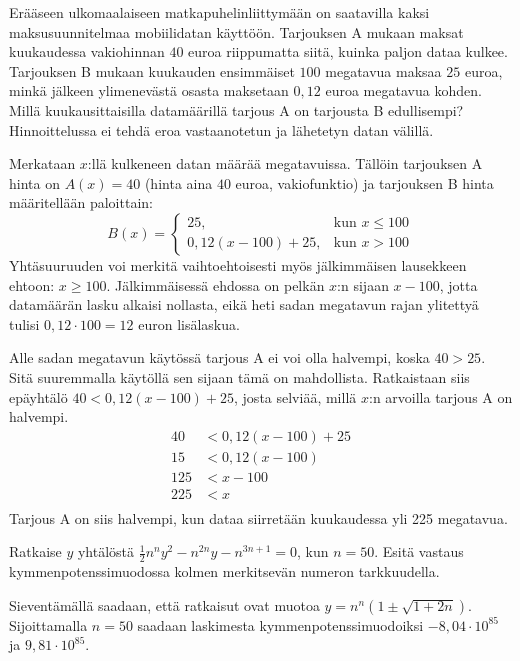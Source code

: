 \begin{multicols}{2}
\begin{tehtava} %
Erääseen ulkomaalaiseen matkapuhelinliittymään on saatavilla kaksi maksusuunnitelmaa mobiilidatan käyttöön. Tarjouksen A mukaan maksat kuukaudessa vakiohinnan $40$ euroa riippumatta siitä, kuinka paljon dataa kulkee. Tarjouksen B mukaan kuukauden ensimmäiset $100$ megatavua maksaa $25$ euroa, minkä jälkeen ylimenevästä osasta maksetaan $0,12$ euroa megatavua kohden. Millä kuukausittaisilla datamäärillä tarjous A on tarjousta B edullisempi? Hinnoittelussa ei tehdä eroa vastaanotetun ja lähetetyn datan välillä.
	\begin{vastaus}
	Merkataan $x$:llä kulkeneen datan määrää megatavuissa. Tällöin tarjouksen A hinta on $A(x)=40$ (hinta aina $40$ euroa, vakiofunktio) ja tarjouksen B hinta määritellään paloittain:
	$$B(x)=\begin{cases}
	25, & \mbox{kun } x\leq 100 \\
	0,12(x-100)+25, & \mbox{kun } x>100
	\end{cases}$$
Yhtäsuuruuden voi merkitä vaihtoehtoisesti myös jälkimmäisen lausekkeen ehtoon: $x\geq 100$. Jälkimmäisessä ehdossa on pelkän $x$:n sijaan $x-100$, jotta datamäärän lasku alkaisi nollasta, eikä heti sadan megatavun rajan ylitettyä tulisi $0,12\cdot 100=12$ euron lisälaskua.

Alle sadan megatavun käytössä tarjous A ei voi olla halvempi, koska $40>25$. Sitä suuremmalla käytöllä sen sijaan tämä on mahdollista. Ratkaistaan siis epäyhtälö $40<0,12(x-100)+25$, josta selviää, millä $x$:n arvoilla tarjous A on halvempi.
\begin{align*}
40&<0,12(x-100)+25 \\
15 &<0,12(x-100) \\
125&<x-100 \\
225&<x \\
\end{align*}
	Tarjous A on siis halvempi, kun dataa siirretään kuukaudessa yli 225 megatavua.
	\end{vastaus}
\end{tehtava}

\begin{tehtava}
Ratkaise $y$ yhtälöstä $\frac{1}{2}n^n y^2-n^{2n}y-n^{3n+1}=0$, kun $n=50$. Esitä vastaus kymmenpotenssimuodossa kolmen merkitsevän numeron tarkkuudella.
	\begin{vastaus}
	Sieventämällä saadaan, että ratkaisut ovat muotoa $y=n^n (1\pm \sqrt{1+2n})$. Sijoittamalla $n=50$ saadaan laskimesta kymmenpotenssimuodoiksi $-8,04\cdot 10^{85}$ ja $9,81\cdot 10^{85}$.
	\end{vastaus}
\end{tehtava}


\end{multicols}
